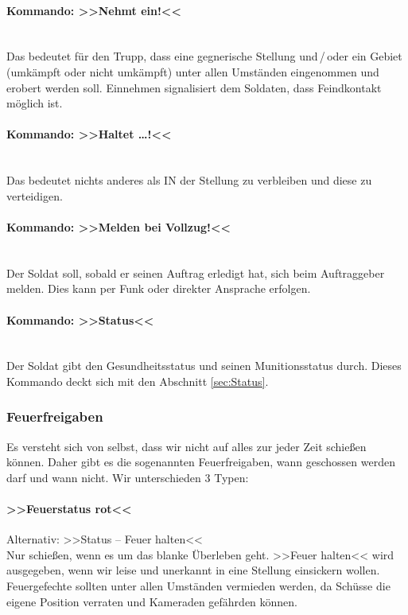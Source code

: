 \paragraph*{Kommando: >>Nehmt ein!<<}\hfil\\
	Das bedeutet für den Trupp, dass eine gegnerische Stellung und\,/\,oder ein Gebiet (umkämpft oder nicht umkämpft) unter allen Umständen eingenommen und erobert werden soll. Einnehmen signalisiert dem Soldaten, dass Feindkontakt möglich ist.

\paragraph*{Kommando: >>Haltet \dots!<<}\hfil\\
	Das bedeutet nichts anderes als IN der Stellung zu verbleiben und diese zu verteidigen.

\paragraph*{Kommando: >>Melden bei Vollzug!<<}\hfil\\
	Der Soldat soll, sobald er seinen Auftrag erledigt hat, sich beim Auftraggeber melden. Dies kann per Funk oder direkter Ansprache erfolgen.

\paragraph*{Kommando: >>Status<<}\hfil\\
	Der Soldat gibt den Gesundheitsstatus und seinen Munitionsstatus durch. Dieses Kommando deckt sich mit den Abschnitt \ref{sec:Status}.

\subsubsection{Feuerfreigaben}
	Es versteht sich von selbst, dass wir nicht auf alles zur jeder Zeit schießen können. Daher gibt es die sogenannten Feuerfreigaben, wann geschossen werden darf und wann nicht. Wir unterschieden 3 Typen:

\paragraph*{>>Feuerstatus rot<<}
	Alternativ: >>Status -- Feuer halten<<\hfil\\
	Nur schießen, wenn es um das blanke Überleben geht. >>Feuer halten<< wird ausgegeben, wenn wir leise und unerkannt in eine Stellung einsickern wollen. Feuergefechte sollten unter allen Umständen vermieden werden, da Schüsse die eigene Position verraten und Kameraden gefährden können.

